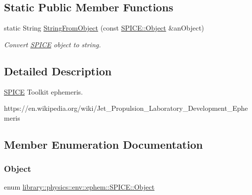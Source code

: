 \subsection*{Static Public Member Functions}
\begin{DoxyCompactItemize}
\item 
static String \hyperlink{classlibrary_1_1physics_1_1env_1_1ephem_1_1_s_p_i_c_e_aebeefe1b806d93e576a0b08c8d24b250}{String\+From\+Object} (const \hyperlink{classlibrary_1_1physics_1_1env_1_1ephem_1_1_s_p_i_c_e_a86f1a863677210ba8884807cc725c0f8}{S\+P\+I\+C\+E\+::\+Object} \&an\+Object)
\begin{DoxyCompactList}\small\item\em Convert \hyperlink{classlibrary_1_1physics_1_1env_1_1ephem_1_1_s_p_i_c_e}{S\+P\+I\+CE} object to string. \end{DoxyCompactList}\end{DoxyCompactItemize}


\subsection{Detailed Description}
\hyperlink{classlibrary_1_1physics_1_1env_1_1ephem_1_1_s_p_i_c_e}{S\+P\+I\+CE} Toolkit ephemeris. 

https\+://en.wikipedia.\+org/wiki/\+Jet\+\_\+\+Propulsion\+\_\+\+Laboratory\+\_\+\+Development\+\_\+\+Ephemeris 

\subsection{Member Enumeration Documentation}
\mbox{\label{classlibrary_1_1physics_1_1env_1_1ephem_1_1_s_p_i_c_e_a86f1a863677210ba8884807cc725c0f8}} 
\subsubsection{\texorpdfstring{Object}{Object}}
{\footnotesize\ttfamily enum \hyperlink{classlibrary_1_1physics_1_1env_1_1ephem_1_1_s_p_i_c_e_a86f1a863677210ba8884807cc725c0f8}{library\+::physics\+::env\+::ephem\+::\+S\+P\+I\+C\+E\+::\+Object}\hspace{0.3cm}{\ttfamily [strong]}}



